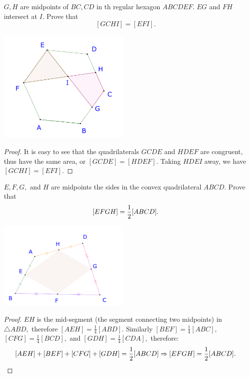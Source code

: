 \documentclass{article}
\begin{document}
\newpage

\begin{example*}[Example 4]
    \label{example:23-24-s3-i-p4}
    $G, H$ are midpoints of $BC, CD$ in th regular hexagon $ABCDEF.$
    $EG$ and $FH$ intersect at $I.$ Prove that
    \[
        [GCHI] = [EFI].
    \]
\end{example*}

\begin{center}
    \includegraphics[width=6.5cm]{./svg/pdf/23-24-s3-i-p4.pdf}
\end{center}

\begin{proof}
    It is easy to see that the quadrilaterals $GCDE$ and $HDEF$ are congruent, thus have the same area, or $[GCDE] = [HDEF].$
    Taking $HDEI$ away, we have $[GCHI] = [EFI].$ 
\end{proof}

\begin{example*}[Example 5]
    $E, F, G,$ and $H$ are midpoints the sides in the convex quadrilateral $ABCD.$
    Prove that
    \[
        [EFGH] = \frac{1}{2} [ABCD].
    \]
\end{example*}

\begin{center}
    \includegraphics[width=6.5cm]{./svg/pdf/23-24-s3-i-p5.pdf}
\end{center}

\begin{proof}
    $EH$ is the mid-segment (the segment connecting two midpoints) in $\triangle ABD,$ therefore $[AEH] = \frac{1}{4}[ABD].$
    Similarly $[BEF] = \frac{1}{4}[ABC],$ $[CFG] = \frac{1}{4}[BCD],$ and $[GDH] = \frac{1}{4}[CDA],$ therefore:
    \[ 
        [AEH] + [BEF] + [CFG] + [GDH] = \frac{1}{2} [ABCD] \Rightarrow [EFGH] = \frac{1}{2} [ABCD].
    \]
\end{proof}
\end{document}

